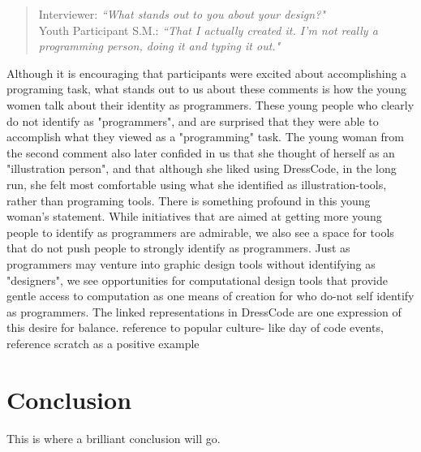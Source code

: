 \documentclass{sigchi}
\begin{document}
 \begin{quote}
 Interviewer: \textit{``What stands out to you about your design?"}
 \\Youth Participant S.M.: \textit{``That I actually created it. I'm not really a programming person, doing it and typing it out."}
 \end{quote}

Although it is encouraging that participants were excited about accomplishing a programing task, what stands out to us about these comments is how the young women talk about their identity as programmers. These young people who clearly do not identify as "programmers", and are surprised that they were able to accomplish what they viewed as a "programming" task. The young woman from the second comment also later confided in us that she thought of herself as an "illustration person", and that although she liked using DressCode, in the long run, she felt most comfortable using what she identified as illustration-tools, rather than programing tools. 
There is something profound in this young woman's statement. While initiatives that are aimed at getting more young people to identify as programmers are admirable, we also see a space for tools that do not push people to strongly identify as programmers. Just as programmers may venture into graphic design tools without identifying as "designers", we see opportunities for computational design tools that provide gentle access to computation as one means of creation for who do-not self identify as programmers. The linked representations in DressCode are one expression of this desire for balance.
reference to popular culture- like day of code events, reference scratch as a positive example

\section{Conclusion}
This is where a brilliant conclusion will go.


{\footnotesize
}
\end{document}

